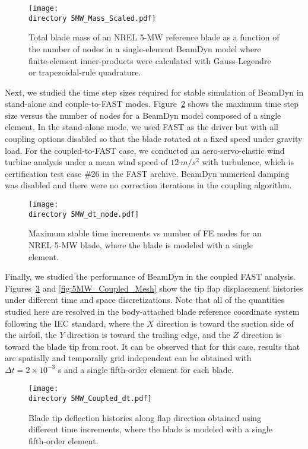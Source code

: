 \documentclass{aiaa-tc}
\def\directory{EPSF/}
\begin{document}
\begin{figure}
    \centering
\texttt{[image: \\directory  5MW\_Mass\_Scaled.pdf]}
\caption{Total blade mass of an NREL 5-MW reference blade as a function of the number of nodes in a single-element BeamDyn model where finite-element inner-products were calculated with Gauss-Legendre or trapezoidal-rule quadrature.}
\label{fig:5MWMass}
\end{figure} 

Next, we studied the time step sizes required for stable simulation of BeamDyn in stand-alone and couple-to-FAST modes. Figure~\ref{fig:5MWdt_node} shows the maximum time step size versus the number of nodes for a BeamDyn model composed of a single element. In the stand-alone mode, we used FAST as the driver but with all coupling options disabled so that the blade rotated at a fixed speed under gravity load. For the coupled-to-FAST case, we conducted an aero-servo-elastic wind turbine analysis under a mean wind speed of $12~m/s^2$ with turbulence, which is  certification test case \#26 in the FAST archive.  BeamDyn numerical damping was disabled and there were no correction iterations in the coupling algorithm.

\begin{figure}
    \centering
\texttt{[image: \\directory  5MW\_dt\_node.pdf]}
\caption{Maximum stable time increments vs number of FE nodes for an NREL 5-MW blade, where the blade is modeled with a single element.}
\label{fig:5MWdt_node}
\end{figure} 

Finally, we studied the performance of BeamDyn in the coupled FAST analysis. Figures~\ref{fig:5MW_Coupled_dt} and \ref{fig:5MW_Coupled_Mesh} show the tip flap displacement histories under different time and space discretizations. Note that all of the quantities studied here are resolved in the body-attached blade reference coordinate system following the IEC standard, where the $X$ direction is toward the suction side of the airfoil, the $Y$ direction is toward the trailing edge, and the $Z$ direction is toward the blade tip from root. It can be observed that for this case, results that are spatially and temporally grid independent can be obtained with $\Delta t = 2 \times 10^{-3}$ s  and a single fifth-order element for each blade.  

\begin{figure}
    \centering
\texttt{[image: \\directory  5MW\_Coupled\_dt.pdf]}
\caption{Blade tip deflection histories along flap direction obtained using different time increments, where the blade is modeled with a single fifth-order element.}
\label{fig:5MW_Coupled_dt}
\end{figure} 
\end{document}
